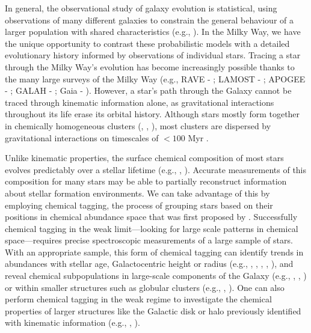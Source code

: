 \documentclass[a4paper,fleqn,usenatbib]{mnras}
\begin{document}
In general, the observational study of galaxy evolution is statistical, using observations of many different galaxies to constrain the general behaviour of a larger population with shared characteristics (e.g., \citealt{VanDokkum2013}). In the Milky Way, we have the unique opportunity to contrast these probabilistic models with a detailed evolutionary history informed by observations of individual stars. Tracing a star through the Milky Way's evolution has become increasingly possible thanks to the many large surveys of the Milky Way (e.g., RAVE - \citealt{Steinmetz2006}; LAMOST - \citealt{Zhao2012}; APOGEE - \citealt{Majewski2015}; GALAH - \citealt{DeSilva2015}; Gaia - \citealt{GaiaCollaboration2016}). However, a star's path through the Galaxy cannot be traced through kinematic information alone, as gravitational interactions throughout its life erase its orbital history. Although stars mostly form together in chemically homogeneous clusters (\citealt{DeSilva2006}, \citealt{DeSilva2007}, \citealt{Bovy2016}), most clusters are dispersed by gravitational interactions on timescales of $< 100$ Myr \citep{Lada2003}. 

Unlike kinematic properties, the surface chemical composition of most stars evolves predictably over a stellar lifetime (e.g., \citealt{Kraft1994}, \citealt{Weiss2000}). Accurate measurements of this composition for many stars may be able to partially reconstruct information about stellar formation environments. We can take advantage of this by employing chemical tagging, the process of grouping stars based on their positions in chemical abundance space that was first proposed by \citet{Freeman2002}. Successfully chemical tagging in the weak limit---looking for large scale patterns in chemical space---requires precise spectroscopic measurements of a large sample of stars. With an appropriate sample, this form of chemical tagging can identify trends in abundances with stellar age, Galactocentric height or radius (e.g., \citealt{Haywood2013}, \citealt{Hayden2015}, \citealt{Anders2016}, \citealt{Bovy2015}, \citealt{Fernandez-Alvar2016}), and reveal chemical subpopulations in large-scale components of the Galaxy (e.g., \citealt{Martell2010}, \citealt{Schiavon2015}, \citealt{Recio-Blanco2017}) or within smaller structures such as globular clusters (e.g., \citealt{Schiavon2016}, \citealt{Tang2017}). One can also perform chemical tagging in the weak regime to investigate the chemical properties of larger structures like the Galactic disk or halo previously identified with kinematic information (e.g., \citealt{Hawkins2015}, \citealt{Wojno2016}).
\end{document}
